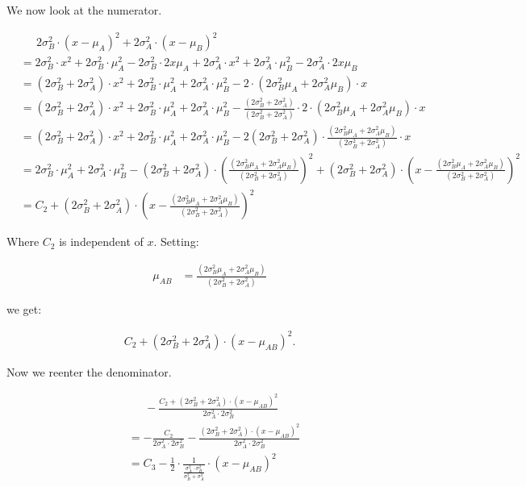 We now look at the numerator.

\begin{align*}
&\phantom{\text{ = }} 2\sigma_B^2 \cdot (x-\mu_A)^2+2\sigma_A^2 \cdot (x-\mu_B)^2 \\
&=
2\sigma_B^2 \cdot x^2 + 2\sigma_B^2 \cdot \mu_A^2 - 2\sigma_B^2 \cdot 2x\mu_A +
2\sigma_A^2 \cdot x^2 + 2\sigma_A^2 \cdot \mu_B^2 - 2\sigma_A^2 \cdot 2x\mu_B \\
&=
(2\sigma_B^2 + 2\sigma_A^2) \cdot x^2 +
2\sigma_B^2 \cdot \mu_A^2 + 2\sigma_A^2 \cdot \mu_B^2 -
2 \cdot (2\sigma_B^2 \mu_A + 2\sigma_A^2 \mu_B) \cdot x \\
&=
(2\sigma_B^2 + 2\sigma_A^2) \cdot x^2 +
2\sigma_B^2 \cdot \mu_A^2 + 2\sigma_A^2 \cdot \mu_B^2 -
\frac{(2\sigma_B^2 + 2\sigma_A^2)}{(2\sigma_B^2 + 2\sigma_A^2)} \cdot
2 \cdot (2\sigma_B^2 \mu_A + 2\sigma_A^2 \mu_B) \cdot x \\
&=
(2\sigma_B^2 + 2\sigma_A^2) \cdot x^2 +
2\sigma_B^2 \cdot \mu_A^2 + 2\sigma_A^2 \cdot \mu_B^2 -
2 (2\sigma_B^2 + 2\sigma_A^2) \cdot
\frac{(2\sigma_B^2 \mu_A + 2\sigma_A^2 \mu_B)}{(2\sigma_B^2 + 2\sigma_A^2)} \cdot x \\
&=
2\sigma_B^2 \cdot \mu_A^2 + 2\sigma_A^2 \cdot \mu_B^2 -
(2\sigma_B^2 + 2\sigma_A^2) \cdot \left( \frac{(2\sigma_B^2 \mu_A + 2\sigma_A^2 \mu_B)}{(2\sigma_B^2 + 2\sigma_A^2)} \right)^2 +
(2\sigma_B^2 + 2\sigma_A^2) \cdot
\left (x - \frac{(2\sigma_B^2 \mu_A + 2\sigma_A^2 \mu_B)}{(2\sigma_B^2 + 2\sigma_A^2)}\right)^2 \\
&=
C_2 + (2\sigma_B^2 + 2\sigma_A^2) \cdot
\left(x - \frac{(2\sigma_B^2 \mu_A + 2\sigma_A^2 \mu_B)}{(2\sigma_B^2 + 2\sigma_A^2)}\right)^2
\end{align*}

Where $C_2$ is independent of $x$. Setting:

\begin{align*}
\mu_{AB} &= \frac{(2\sigma_B^2 \mu_A + 2\sigma_A^2 \mu_B)}{(2\sigma_B^2 + 2\sigma_A^2)}
\end{align*}

we get:

\begin{align*}
C_2 + (2\sigma_B^2 + 2\sigma_A^2) \cdot (x - \mu_{AB})^2.
\end{align*}

Now we reenter the denominator.

\begin{align*}
&\phantom{\text{ = }} -\frac{C_2 + (2\sigma_B^2 + 2\sigma_A^2) \cdot (x - \mu_{AB})^2}{
                             2\sigma_A^2 \cdot 2\sigma_B^2} \\
&= - \frac{C_2}{2\sigma_A^2 \cdot 2\sigma_B^2} - \frac{(2\sigma_B^2 + 2\sigma_A^2) \cdot (x - \mu_{AB})^2}{
                                                      2\sigma_A^2 \cdot 2\sigma_B^2} \\
&= C_3 - \frac{1}{2} \cdot
\frac{1}{\frac{\sigma_A^2 \cdot \sigma_B^2}{\sigma_B^2 + \sigma_A^2}}
\cdot (x - \mu_{AB})^2
\end{align*}

